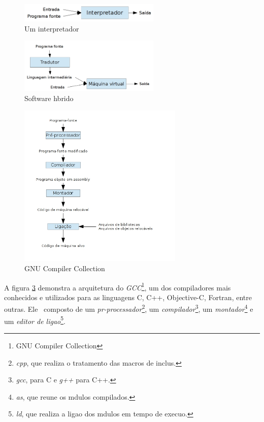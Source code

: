 \begin{figure}[htp]
  \begin{center}
    \includegraphics[width=0.6\textwidth]{figuras/interpretador}
  \end{center}
  \caption{Um interpretador}
  \label{fig:interpretador}
\end{figure}

\begin{figure}[htp]
  \begin{center}
    \includegraphics[width=0.6\textwidth]{figuras/hibrido}
  \end{center}
  \caption{Software h\ih brido}
  \label{fig:hibrido}
\end{figure}

\begin{figure}[htp]
  \begin{center}
    \includegraphics[width=0.7\textwidth]{figuras/gccarch}
  \end{center}
  \caption{GNU Compiler Collection}
  \label{fig:gccarch}
\end{figure}

A figura \ref{fig:gccarch} demonstra a arquitetura do \emph{GCC}\footnote{GNU Compiler Collection}, um dos compiladores mais conhecidos e utilizados para as linguagens C, C++, Objective-C, Fortran, entre outras. Ele \eh\ composto de um \emph{pr\eh -processador}\footnote{\emph{cpp}, que realiza o tratamento das macros de inclus\ao.}, um \emph{compilador}\footnote{\emph{gcc}, para C e \emph{g++} para C++.}, um \emph{montador}\footnote{\emph{as}, que reune os m\oh dulos compilados.} e um \emph{editor de liga\ca o}\footnote{\emph{ld}, que realiza a liga\ca o dos m\oh dulos em tempo de execu\ca o.}.

